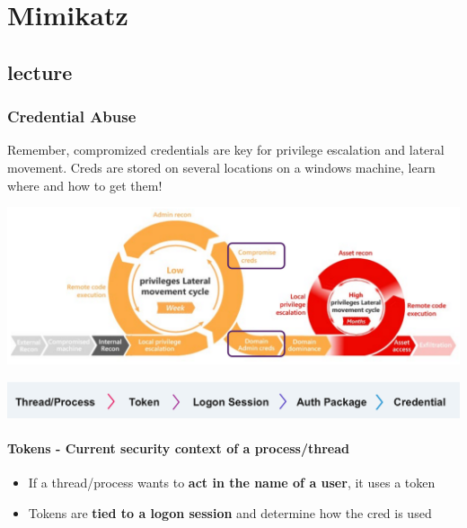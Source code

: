
\chapter{Mimikatz}
\newpage

\section{lecture}

\subsection{Credential Abuse}
Remember, compromized credentials are key for privilege escalation and lateral movement.
Creds are stored on several locations on a windows machine, learn where and how to get them!

\includegraphics[width=\textwidth]{resources/11-abuse-general-approach.png}

% 

\includegraphics[width=\textwidth]{resources/11-win-credential-management.png}

\subsubsection*{Tokens - Current security context of a process/thread}
\begin{itemize}
    \item If a thread/process wants to \textbf{act in the name of a user}, it uses a token
    \item Tokens are \textbf{tied to a logon session} and determine how the cred is used
\end{itemize}

